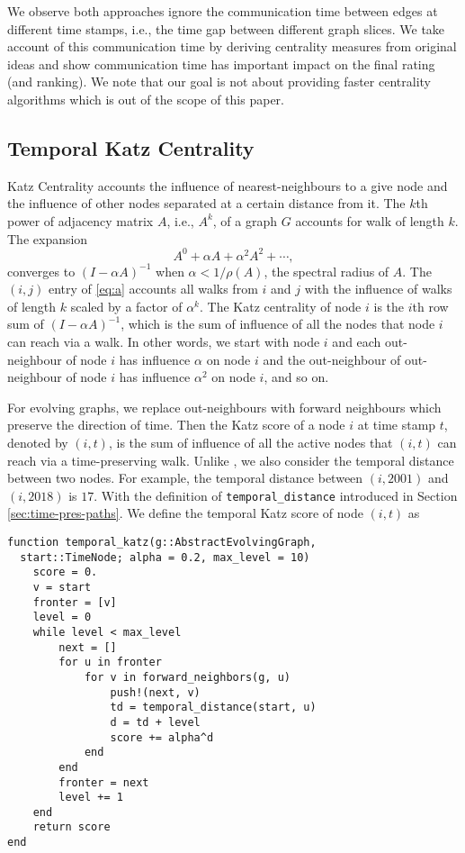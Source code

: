 \documentclass[12pt]{article}
\theoremstyle{definition}
\begin{document}
We observe both approaches ignore the communication time between edges at different time stamps, i.e., the time gap between different graph slices. We take account of this communication time by deriving centrality measures from original ideas and show communication time has important impact on the final rating (and ranking).
We note that our goal is not about providing faster centrality algorithms which is out of the scope of this paper.

\subsection{Temporal Katz Centrality}
\label{sec:temp-katz-centr}

Katz Centrality accounts the influence of nearest-neighbours to a give node and the influence of other nodes
separated at a certain distance from it. The $k$th power of adjacency matrix $A$, i.e., $A^k$, of a graph $G$ accounts for walk of length $k$. The expansion
\begin{equation}
  \label{eq:a}
  A^0 + \alpha A + \alpha^2 A^2 + \cdots,
\end{equation}
converges to $(I - \alpha A)^{-1}$ when $\alpha < 1/\rho(A)$, the spectral radius of $A$. The $(i,j)$ entry of \eqref{eq:a}
accounts all walks from $i$ and $j$ with the influence of walks of length $k$ scaled by a factor of $\alpha^k$.
The Katz centrality of node $i$ is the $i$th row sum of $(I - \alpha A)^{-1}$, which is the sum of influence of all the nodes that node $i$ can reach via a walk.
In other words, we start with node $i$ and each out-neighbour of node $i$ has influence $\alpha$ on node $i$ and the out-neighbour of out-neighbour of node $i$ has influence $\alpha^2$ on node $i$, and so on.

For evolving graphs, we replace out-neighbours with forward neighbours which preserve the direction of time.
Then the Katz score of a node $i$ at time stamp $t$, denoted by $(i,t)$, is the sum of influence of all the active nodes that $(i,t)$ can reach via a time-preserving walk.
Unlike \cite{grindrod11}, we also consider the temporal distance between two nodes. For example, the temporal distance between $(i, 2001)$ and $(i, 2018)$ is $17$.
With the definition of \texttt{temporal\_distance} introduced in Section \ref{sec:time-pres-paths}.
We define the temporal Katz score of node $(i, t)$ as

\begin{lstlisting}[caption={Temporal Katz Centrality of Single Node},label={lst:katz}]
function temporal_katz(g::AbstractEvolvingGraph,
  start::TimeNode; alpha = 0.2, max_level = 10)
    score = 0.
    v = start
    fronter = [v]
    level = 0
    while level < max_level
        next = []
        for u in fronter
            for v in forward_neighbors(g, u)
                push!(next, v)
                td = temporal_distance(start, u)
                d = td + level
                score += alpha^d
            end
        end
        fronter = next
        level += 1
    end
    return score
end
\end{lstlisting}
\end{document}

